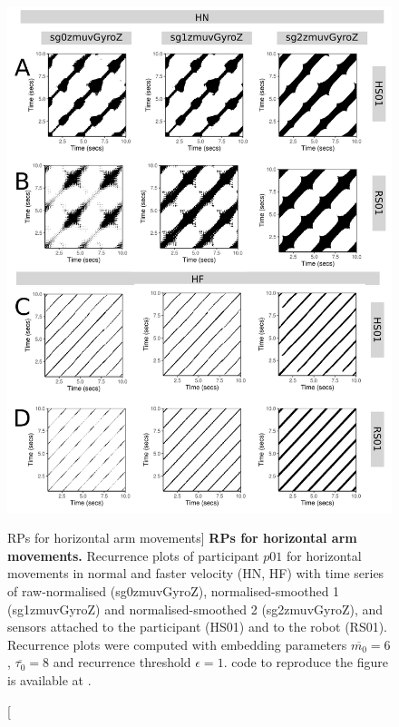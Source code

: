 \begin{figure}
\centering
\includegraphics[height=0.80\textheight]{fig_6_06}
\caption
	[RPs for horizontal arm movements]{
	{\bf RPs for horizontal arm movements.}	
	Recurrence plots %
	of participant $p01$ for horizontal movements in normal and faster 
	velocity (HN, HF) with time series of raw-normalised (sg0zmuvGyroZ), 
	normalised-smoothed 1 (sg1zmuvGyroZ) and 
	normalised-smoothed 2 (sg2zmuvGyroZ), and 
	sensors attached to the participant (HS01) and to the robot (RS01).
	Recurrence plots were computed with 
	embedding parameters $\overline{m_0}=6$, $\overline{\tau_0}=8$ and
	recurrence threshold $\epsilon=1$.
	\R code to reproduce the figure is available at 
	.
        }
    \label{fig:rp_aH}
\end{figure}

